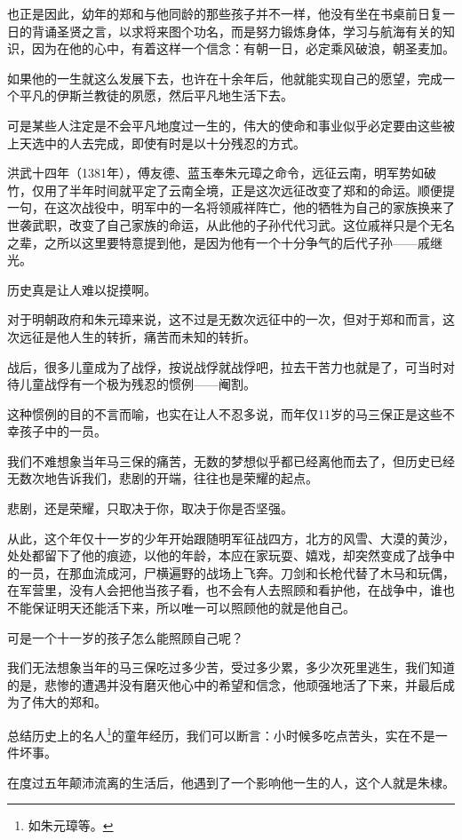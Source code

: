 \begin{multicols}{\theparacolNo}
也正是因此，幼年的郑和与他同龄的那些孩子并不一样，他没有坐在书桌前日复一日的背诵圣贤之言，以求将来图个功名，而是努力锻炼身体，学习与航海有关的知识，因为在他的心中，有着这样一个信念：有朝一日，必定乘风破浪，朝圣麦加。

如果他的一生就这么发展下去，也许在十余年后，他就能实现自己的愿望，完成一个平凡的伊斯兰教徒的夙愿，然后平凡地生活下去。

可是某些人注定是不会平凡地度过一生的，伟大的使命和事业似乎必定要由这些被上天选中的人去完成，即使有时是以十分残忍的方式。

洪武十四年（1381年），傅友德、蓝玉奉朱元璋之命令，远征云南，明军势如破竹，仅用了半年时间就平定了云南全境，正是这次远征改变了郑和的命运。顺便提一句，在这次战役中，明军中的一名将领戚祥阵亡，他的牺牲为自己的家族换来了世袭武职，改变了自己家族的命运，从此他的子孙代代习武。这位戚祥只是个无名之辈，之所以这里要特意提到他，是因为他有一个十分争气的后代子孙——戚继光。

历史真是让人难以捉摸啊。

对于明朝政府和朱元璋来说，这不过是无数次远征中的一次，但对于郑和而言，这次远征是他人生的转折，痛苦而未知的转折。

战后，很多儿童成为了战俘，按说战俘就战俘吧，拉去干苦力也就是了，可当时对待儿童战俘有一个极为残忍的惯例——阉割。

这种惯例的目的不言而喻，也实在让人不忍多说，而年仅11岁的马三保正是这些不幸孩子中的一员。

我们不难想象当年马三保的痛苦，无数的梦想似乎都已经离他而去了，但历史已经无数次地告诉我们，悲剧的开端，往往也是荣耀的起点。

悲剧，还是荣耀，只取决于你，取决于你是否坚强。

从此，这个年仅十一岁的少年开始跟随明军征战四方，北方的风雪、大漠的黄沙，处处都留下了他的痕迹，以他的年龄，本应在家玩耍、嬉戏，却突然变成了战争中的一员，在那血流成河，尸横遍野的战场上飞奔。刀剑和长枪代替了木马和玩偶，在军营里，没有人会把他当孩子看，也不会有人去照顾和看护他，在战争中，谁也不能保证明天还能活下来，所以唯一可以照顾他的就是他自己。

可是一个十一岁的孩子怎么能照顾自己呢？

我们无法想象当年的马三保吃过多少苦，受过多少累，多少次死里逃生，我们知道的是，悲惨的遭遇并没有磨灭他心中的希望和信念，他顽强地活了下来，并最后成为了伟大的郑和。

总结历史上的名人\footnote{如朱元璋等。}的童年经历，我们可以断言：小时候多吃点苦头，实在不是一件坏事。

在度过五年颠沛流离的生活后，他遇到了一个影响他一生的人，这个人就是朱棣。


\end{multicols}
